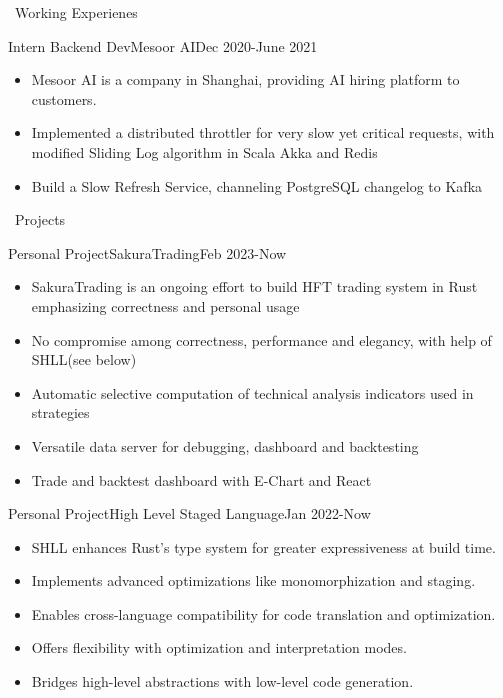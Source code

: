 \documentclass{resume}
\begin{document}
\begin{rSection}{\faUsers~Working Experienes}
    \begin{rExperience}{Intern Backend Dev}{Mesoor AI}{Dec 2020-June 2021}
        \begin{itemize}
            \itemsep -0.5em \vspace{-0.5em}
            \item Mesoor AI is a company in Shanghai, providing AI hiring platform to customers.
            \item Implemented a distributed throttler for very slow yet critical requests, with modified Sliding Log algorithm in Scala Akka and Redis
            \item Build a Slow Refresh Service, channeling PostgreSQL changelog to Kafka       
        \end{itemize}
    \end{rExperience}
\end{rSection}
\begin{rSection}{\faUsers~Projects}
    \begin{rProject}{Personal Project}{SakuraTrading}{Feb 2023-Now}
        \begin{itemize}
            \itemsep -0.5em \vspace{-0.5em}
            \item SakuraTrading is an ongoing effort to build HFT trading system in Rust emphasizing correctness and personal usage
            \item No compromise among correctness, performance and elegancy, with help of SHLL(see below)
            \item Automatic selective computation of technical analysis indicators used in strategies
            \item Versatile data server for debugging, dashboard and backtesting
            \item Trade and backtest dashboard with E-Chart and React
        \end{itemize}
    \end{rProject}
    \begin{rProject}{Personal Project}{High Level Staged Language}{Jan 2022-Now}
        \begin{itemize}
            \itemsep -0.5em \vspace{-0.5em}
            \item SHLL enhances Rust's type system for greater expressiveness at build time.
            \item Implements advanced optimizations like monomorphization and staging.
            \item Enables cross-language compatibility for code translation and optimization.
            \item Offers flexibility with optimization and interpretation modes.
            \item Bridges high-level abstractions with low-level code generation.
        \end{itemize}
    \end{rProject}
\end{rSection}
\end{document}
